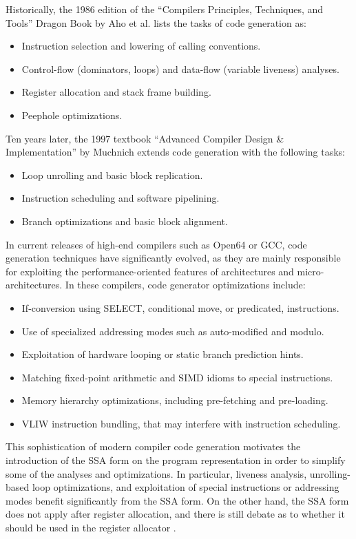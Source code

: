 Historically, the 1986 edition of the ``Compilers Principles, Techniques, and
Tools'' Dragon Book by Aho et al. lists the tasks of code generation as:
\begin{itemize}
\item Instruction selection and lowering of calling conventions.
\item Control-flow (dominators, loops) and data-flow (variable liveness) analyses.
\item Register allocation and stack frame building.
\item Peephole optimizations.
\end{itemize}
Ten years later, the 1997 textbook ``Advanced Compiler Design \& Implementation''
by Muchnich extends code generation with the following tasks: \begin{itemize}
\item Loop unrolling and basic block replication.
\item Instruction scheduling and software pipelining.
\item Branch optimizations and basic block alignment.
\end{itemize}
In current releases of high-end compilers such as Open64 or GCC, code
generation techniques have significantly evolved, as they are mainly responsible
for exploiting the performance-oriented features of architectures and
micro-architectures. In these compilers, code generator optimizations include:
\begin{itemize}
\item If-conversion using SELECT, conditional move, or predicated, instructions.
\item Use of specialized addressing modes such as auto-modified and modulo.
\item Exploitation of hardware looping or static branch prediction hints.
\item Matching fixed-point arithmetic and SIMD idioms to special instructions.
\item Memory hierarchy optimizations, including pre-fetching and pre-loading.
\item VLIW instruction bundling, that may interfere with instruction
scheduling.
\end{itemize}

This sophistication of modern compiler code generation motivates the
introduction of the SSA form on the program representation in order to simplify
some of the analyses and optimizations. In particular, liveness analysis,
unrolling-based loop optimizations, and exploitation of special instructions or
addressing modes benefit significantly from the SSA form. On the other hand,
the SSA form does not apply after register allocation, and there is still
debate as to whether it should be used in the register allocator
\cite{Barik:2013:TACO}.

